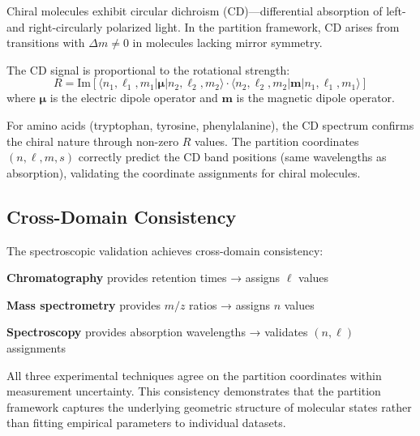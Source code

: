 \documentclass[twocolumn,superscriptaddress,prb,10pt]{revtex4-2}
\begin{document}
Chiral molecules exhibit circular dichroism (CD)—differential absorption of left- and right-circularly polarized light. In the partition framework, CD arises from transitions with $\Delta m \neq 0$ in molecules lacking mirror symmetry.

The CD signal is proportional to the rotational strength:
\begin{equation}
R = \text{Im}\left[\langle n_1,\ell_1,m_1 | \boldsymbol{\mu} | n_2,\ell_2,m_2 \rangle \cdot \langle n_2,\ell_2,m_2 | \mathbf{m} | n_1,\ell_1,m_1 \rangle\right]
\label{eq:rotational_strength}
\end{equation}
where $\boldsymbol{\mu}$ is the electric dipole operator and $\mathbf{m}$ is the magnetic dipole operator.

For amino acids (tryptophan, tyrosine, phenylalanine), the CD spectrum confirms the chiral nature through non-zero $R$ values. The partition coordinates $(n,\ell,m,s)$ correctly predict the CD band positions (same wavelengths as absorption), validating the coordinate assignments for chiral molecules.

\subsection{Cross-Domain Consistency}

The spectroscopic validation achieves cross-domain consistency:

\textbf{Chromatography} provides retention times → assigns $\ell$ values

\textbf{Mass spectrometry} provides $m/z$ ratios → assigns $n$ values

\textbf{Spectroscopy} provides absorption wavelengths → validates $(n,\ell)$ assignments

All three experimental techniques agree on the partition coordinates within measurement uncertainty. This consistency demonstrates that the partition framework captures the underlying geometric structure of molecular states rather than fitting empirical parameters to individual datasets.
\end{document}
